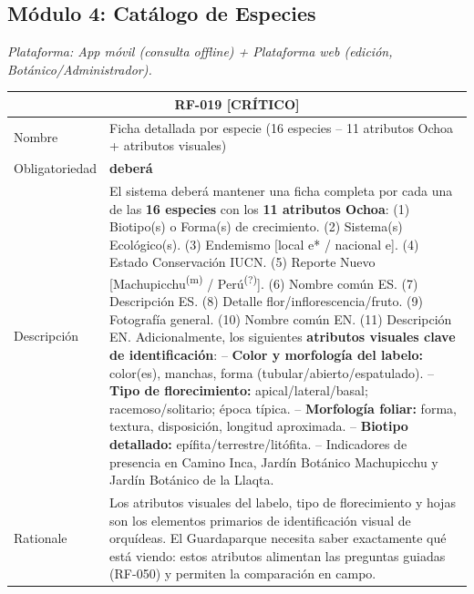 \documentclass[12pt, a4paper]{article}
\newcommand{\criticomark}{\textcolor{criticolor}{\textbf{[CR\'ITICO]}}}
\begin{document}
\subsection{M\'odulo 4: Cat\'alogo de Especies}

\textit{Plataforma: App m\'ovil (consulta offline) + Plataforma web (edici\'on, Bot\'anico/Administrador).}

\begin{longtable}{|p{3cm}|p{11.5cm}|}
\hline
\multicolumn{2}{|c|}{\textbf{RF-019} \criticomark} \\
\hline
Nombre & Ficha detallada por especie (16 especies -- 11 atributos Ochoa + atributos visuales) \\
\hline
Obligatoriedad & \textbf{deber\'a} \\
\hline
Descripci\'on & El sistema deber\'a mantener una ficha completa por cada una de las \textbf{16 especies} con los \textbf{11 atributos Ochoa}:\newline
(1) Biotipo(s) o Forma(s) de crecimiento. (2) Sistema(s) Ecol\'ogico(s). (3) Endemismo [local e* / nacional e]. (4) Estado Conservaci\'on IUCN. (5) Reporte Nuevo [Machupicchu\textsuperscript{(m)} / Per\'u\textsuperscript{(?)}]. (6) Nombre com\'un ES. (7) Descripci\'on ES. (8) Detalle flor/inflorescencia/fruto. (9) Fotograf\'ia general. (10) Nombre com\'un EN. (11) Descripci\'on EN.\newline
Adicionalmente, los siguientes \textbf{atributos visuales clave de identificaci\'on}:\newline
\quad -- \textbf{Color y morfolog\'ia del labelo:} color(es), manchas, forma (tubular/abierto/espatulado).\newline
\quad -- \textbf{Tipo de florecimiento:} apical/lateral/basal; racemoso/solitario; \'epoca t\'ipica.\newline
\quad -- \textbf{Morfolog\'ia foliar:} forma, textura, disposici\'on, longitud aproximada.\newline
\quad -- \textbf{Biotipo detallado:} ep\'ifita/terrestre/lit\'ofita.\newline
\quad -- Indicadores de presencia en Camino Inca, Jard\'in Bot\'anico Machupicchu y Jard\'in Bot\'anico de la Llaqta. \\
\hline
Rationale & Los atributos visuales del labelo, tipo de florecimiento y hojas son los elementos primarios de identificaci\'on visual de orqu\'ideas. El Guardaparque necesita saber exactamente qu\'e est\'a viendo: estos atributos alimentan las preguntas guiadas (RF-050) y permiten la comparaci\'on en campo. \\

\end{longtable}
\end{document}

